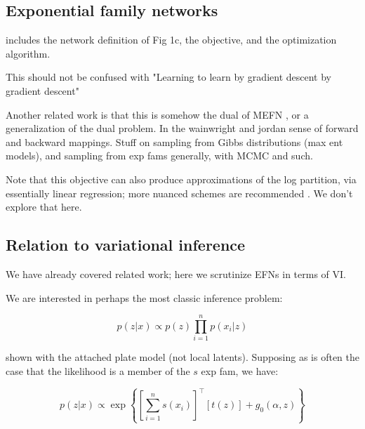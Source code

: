 \documentclass{article}
\begin{document}
 

 \subsection{Exponential family networks}

includes the network definition of Fig 1c, the objective, and the optimization algorithm.
 
This should not be confused with "Learning to learn by gradient descent by gradient descent" \cite{andrychowicz2016learning} 

Another related work is that this is somehow the dual of MEFN \cite{loaiza2017maximum}, or a generalization of the dual problem.  In the wainwright and jordan sense of forward and backward mappings.
Stuff on sampling from Gibbs distributions (max ent models), and sampling from exp fams generally, with MCMC and such.

Note that this objective can also produce approximations of the log partition, via essentially linear regression; more nuanced schemes are recommended \cite{papamakarios2015distilling}.  We don't explore that here.


 \subsection{Relation to variational inference}
 
 We have already covered related work; here we scrutinize EFNs in terms of VI.
 
We are interested in perhaps the most classic inference problem:

$$p(z | x) \propto p(z) \prod_{i=1}^n p(x_i | z)$$

 shown with the attached plate model (not local latents).  Supposing as is often the case that the likelihood is a member of the $s$ exp fam, we have:
 
 $$p(z | x ) \propto \exp\left\{ \left[ \sum_{i=1}^n s(x_i) \right]^\top\left[ t(z) \right] + g_0(\alpha,z) \right\}$$
 
\end{document}
